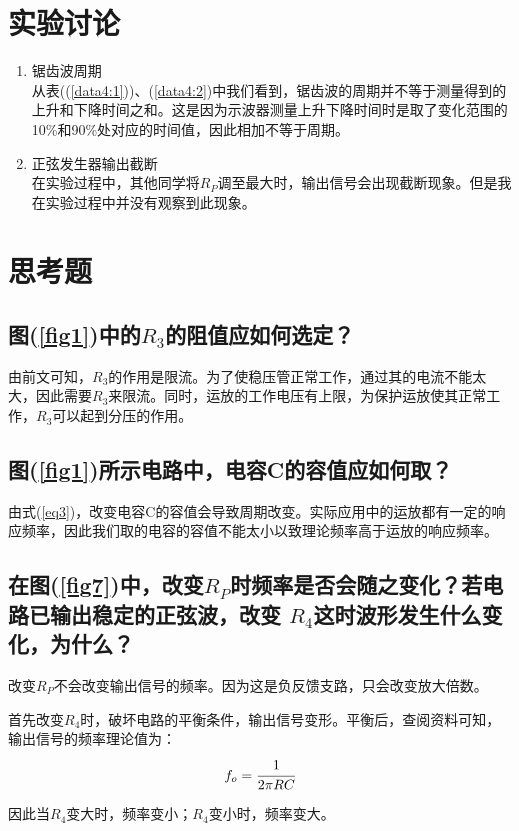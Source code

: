 \documentclass[a4paper]{article}
\begin{document}
\section{实验讨论}
\begin{enumerate}
\item 锯齿波周期\\
从表((\ref{data4:1}))、(\ref{data4:2})中我们看到，锯齿波的周期并不等于测量得到的上升和下降时间之和。这是因为示波器测量上升下降时间时是取了变化范围的10\%和90\%处对应的时间值，因此相加不等于周期。
\item 正弦发生器输出截断\\
在实验过程中，其他同学将$R_P$调至最大时，输出信号会出现截断现象。但是我在实验过程中并没有观察到此现象。
\end{enumerate}

\section{思考题}
\subsection{图(\ref{fig1})中的$R_3$的阻值应如何选定？}
由前文可知，$R_3$的作用是限流。为了使稳压管正常工作，通过其的电流不能太大，因此需要$R_3$来限流。同时，运放的工作电压有上限，为保护运放使其正常工作，$R_3$可以起到分压的作用。
\subsection{图(\ref{fig1})所示电路中，电容C的容值应如何取？}
由式(\ref{eq3})，改变电容C的容值会导致周期改变。实际应用中的运放都有一定的响应频率，因此我们取的电容的容值不能太小以致理论频率高于运放的响应频率。
\subsection{在图(\ref{fig7})中，改变$R_P$时频率是否会随之变化？若电路已输出稳定的正弦波，改变 $R_4$这时波形发生什么变化，为什么？}
改变$R_P$不会改变输出信号的频率。因为这是负反馈支路，只会改变放大倍数。

首先改变$R_4$时，破坏电路的平衡条件，输出信号变形。平衡后，查阅资料可知，输出信号的频率理论值为：
\begin{equation}
f_o = \cfrac{1}{2\pi RC}
\end{equation}

因此当$R_4$变大时，频率变小；$R_4$变小时，频率变大。

\nocite{jiaocai}

\end{document}
